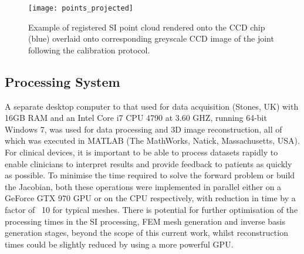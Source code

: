 \documentclass[twoside]{bhamthesis}
\theoremstyle{definition}
\begin{document}
\begin{figure}[!ht]
\texttt{[image: points\_projected]}
\centering
\caption{Example of registered SI point cloud rendered onto the CCD chip (blue) overlaid onto corresponding greyscale CCD image of the joint following the calibration protocol.}
\centering
\label{fig:points_projected}
\end{figure}


\subsection{Processing System}
A separate desktop computer to that used for data acquisition (Stones, UK) with 16GB RAM and an Intel Core i7 CPU 4790 at 3.60 GHZ, running 64-bit Windows 7, was used for data processing and 3D image reconstruction, all of which was executed in MATLAB (The MathWorks, Natick, Massachusetts, USA). For clinical devices, it is important to be able to process datasets rapidly to enable clinicians to interpret results and provide feedback to patients as quickly as possible. To minimise the time required to solve the forward problem or build the Jacobian, both these operations were implemented in parallel \cite{doulgerakis2017towards} either on a GeForce GTX 970 GPU or on the CPU respectively, with reduction in time by a factor of ~10 for typical meshes. There is potential for further optimisation of the processing times in the SI processing, FEM mesh generation and inverse basis generation stages, beyond the scope of this current work, whilst reconstruction times could be slightly reduced by using a more powerful GPU. 
\end{document}

